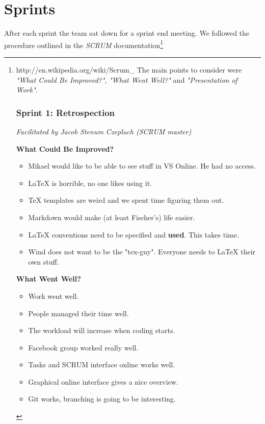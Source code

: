 \section{Sprints}
After each sprint the team sat down for a sprint end meeting. We followed the procedure outlined in the \textit{SCRUM} documentation\footnote{http://en.wikipedia.org/wiki/Scrum_%
The main points to consider were \textit{"What Could Be Improved?"}, \textit{"What Went Well?"} and \textit{"Presentation of Work"}.
\subsubsection{Sprint 1: Retrospection}
\label{sec:sprint1}
\small{\textit{Facilitated by Jacob Stenum Czepluch (SCRUM master)}} 

\textbf{What Could Be Improved?}

\begin{itemize}
	\item Mikael would like to be able to see stuff in VS Online. He had no access.
	\item LaTeX is horrible, no one likes using it.
	\item TeX templates are weird and we spent time figuring them out.
	\item Markdown would make (at least Fischer's) life easier. 
	\item LaTeX conventions need to be specified and \textbf{used}. This takes time.
	\item Wind does not want to be the "tex-guy". Everyone needs to LaTeX their own stuff.
\end{itemize}

\textbf{What Went Well?}

\begin{itemize}
	\item Work went well. 
	\item People managed their time well.
	\item The workload will increase when coding starts.
	\item Facebook group worked really well.
	\item Tasks and SCRUM interface online works well.
	\item Graphical online interface gives a nice overview.
	\item Git works, branching is going to be interesting. 
\end{itemize}

}
